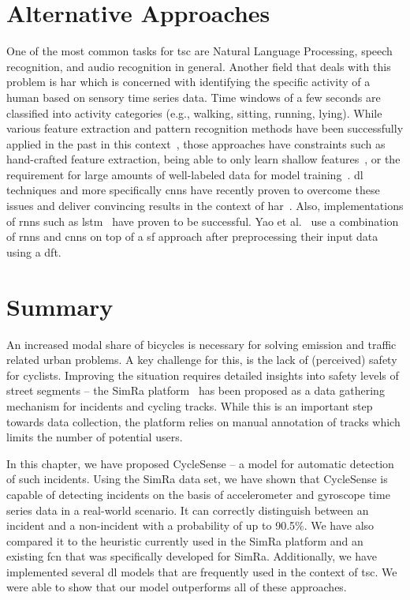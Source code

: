 \section{Alternative Approaches}
\label{sec:related_work_cyclesense}
One of the most common tasks for \ac{tsc} are Natural Language Processing, speech recognition, and audio recognition in general.
Another field that deals with this problem is \acf{har} which is concerned with identifying the specific activity of a human based on sensory time series data.
Time windows of a few seconds are classified into activity categories (e.g., walking, sitting, running, lying).
While various feature extraction and pattern recognition methods have been successfully applied in the past in this context~\cite{bulling2014tutorial}, those approaches have constraints such as hand-crafted feature extraction, being able to only learn shallow features~\cite{yang2015deep}, or the requirement for large amounts of well-labeled data for model training~\cite{wang2019deep}.
\acl{dl} techniques and more specifically \acp{cnn} have recently proven to overcome these issues and deliver convincing results in the context of \ac{har}~\cite{wang2019deep,ronao2015deep}.
Also, implementations of \acp{rnn} such as \ac{lstm}~\cite{tao2016multicolumn,yao2017deepsense} have proven to be successful.
Yao et al.\ \cite{yao2017deepsense} use a combination of \acp{rnn} and \acp{cnn} on top of a \ac{sf} approach after preprocessing their input data using a \ac{dft}.

\section{Summary}
\label{sec:summary_cyclesense}
An increased modal share of bicycles is necessary for solving emission and traffic related urban problems.
A key challenge for this, is the lack of (perceived) safety for cyclists.
Improving the situation requires detailed insights into safety levels of street segments -- the SimRa platform~\cite{karakaya2020simra} has been proposed as a data gathering mechanism for incidents and cycling tracks.
While this is an important step towards data collection, the platform relies on manual annotation of tracks which limits the number of potential users.

In this chapter, we have proposed CycleSense -- a model for automatic detection of such incidents.
Using the SimRa data set, we have shown that CycleSense is capable of detecting incidents on the basis of accelerometer and gyroscope time series data in a real-world scenario.
It can correctly distinguish between an incident and a non-incident with a probability of up to 90.5\%.
We have also compared it to the heuristic currently used in the SimRa platform and an existing \ac{fcn} that was specifically developed for SimRa.
Additionally, we have implemented several \ac{dl} models that are frequently used in the context of \ac{tsc}.
We were able to show that our model outperforms all of these approaches.

